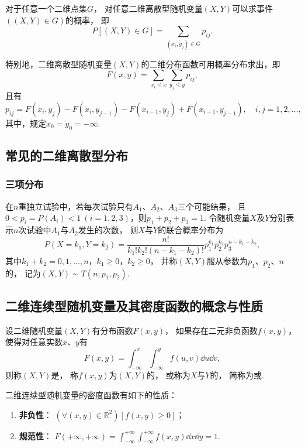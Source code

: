 \begin{theorem}
对于任意一个二维点集\(G\)，
对任意二维离散型随机变量\((X,Y)\)可以求事件\(((X,Y) \in G)\)的概率，
即\[
	P\left[(X,Y) \in G\right] = \sum_{(x_i,y_j) \in G} p_{ij}.
\]

特别地，二维离散型随机变量\((X,Y)\)的二维分布函数可用概率分布求出，即\[
	F(x,y) = \sum_{x_i \leq x}\sum_{y_j \leq y} p_{ij},
\]且有\[
	p_{ij} = F(x_i,y_j) - F(x_i,y_{j-1}) - F(x_{i-1},y_j) + F(x_{i-1},y_{j-1}),
	\quad i,j = 1,2,\dotsc,
\]
其中，规定\(x_0 = y_0 = -\infty\).
\end{theorem}

\subsection{常见的二维离散型分布}
\subsubsection{三项分布}
\begin{definition}
在\(n\)重独立试验中，若每次试验只有\(A_1\)、\(A_2\)、\(A_3\)三个可能结果，
且\(0 < p_i = P(A_i) < 1\ (i=1,2,3)\)，则\(p_1 + p_2 + p_3 = 1\).
令随机变量\(X\)及\(Y\)分别表示\(n\)次试验中\(A_1\)与\(A_2\)发生的次数，
则\(X\)与\(Y\)的联合概率分布为\[
	P(X=k_1,Y=k_2)
	= \frac{n!}{k_1! k_2! (n-k_1-k_2)!} p_1^{k_1} p_2^{k_2} p_3^{n-k_1-k_2},
\]
其中\(k_1+k_2 = 0,1,\dotsc,n\)，\(k_1 \geq 0\)，\(k_2 \geq 0\)，
并称\((X,Y)\)服从参数为\(p _1\)、\(p_2\)、\(n\)的，
记为\((X,Y) \sim T(n;p_1,p_2)\).
\end{definition}

\subsection{二维连续型随机变量及其密度函数的概念与性质}

\begin{definition}
设二维随机变量\((X,Y)\)有分布函数\(F(x,y)\)，
如果存在二元非负函数\(f(x,y)\)，
使得对任意实数\(x\)、\(y\)有\[
	F(x,y) = \int_{-\infty}^x \int_{-\infty}^y f(u,v) \dd{u} \dd{v},
\]
则称\((X,Y)\)是，
称\(f(x,y)\)为\((X,Y)\)的，
或称为\(X\)与\(Y\)的，
简称为或.
\end{definition}

\begin{property}
二维连续型随机变量的密度函数有如下的性质：
\begin{enumerate}
	\item {\bf 非负性}：
	\((\forall (x,y)\in\mathbb{R}^2)[f(x,y) \geq 0]\)；

	\item {\bf 规范性}：
	\(F(+\infty,+\infty)
	= \int_{-\infty}^{+\infty} \int_{-\infty}^{+\infty} f(x,y) \dd{x} \dd{y} = 1\).
\end{enumerate}
\end{property}

